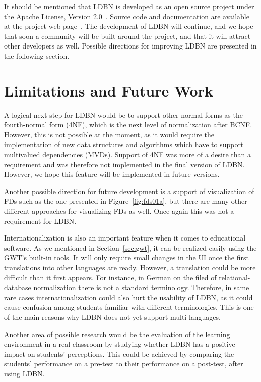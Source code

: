 It should be mentioned that LDBN is developed as an open source project 
under the Apache License, Version 2.0~\cite{walv2}. 
Source code and documentation are available at the project web-page~\cite{wldbnp}. 
The development of LDBN will continue, and we
hope that soon a community will be
built around the project, and that it will attract other developers as well. Possible directions for 
improving LDBN are presented in the following section. 

\section{Limitations and Future Work}
A logical next step for LDBN would be to support
other normal forms as the fourth-normal form (4NF), which is the next level 
of normalization after BCNF.
However, this is not possible at the moment, as it would
require the implementation of new data structures and algorithms which have to 
support multivalued dependencies (MVDs). Support of 4NF was more of a desire than a requirement and
was therefore not implemented in the final version of LDBN. However, we hope this feature will be implemented
in future versions. 

Another possible direction for future development is a support of visualization of FDs such as the
one presented in Figure~\ref{fig:fds01a}, but there are many other different approaches for visualizing FDs as well.
Once again this was not a requirement for LDBN. 

Internationalization is also an important feature when it comes to educational software.
As we mentioned in Section~\ref{sec:gwt}, it can be realized easily using the GWT's built-in tools.
It will only require 
small changes in the UI once the first translations into other languages are ready. However, a translation 
could be more difficult than it first appears. For instance, in German on the filed of relational-database
normalization
there is not a standard terminology. Therefore,
in same rare cases internationalization could also hurt the usability 
of LDBN, as it could cause confusion among students familiar with different terminologies.
This is one of the main reasons why LDBN does not yet support multi-languages.

Another area of possible research would be the evaluation of the learning environment 
in a real classroom by
studying whether LDBN has a positive impact on students' perceptions.
This could be achieved by comparing the students' performance on a pre-test to their
performance on a post-test, after using LDBN.  
